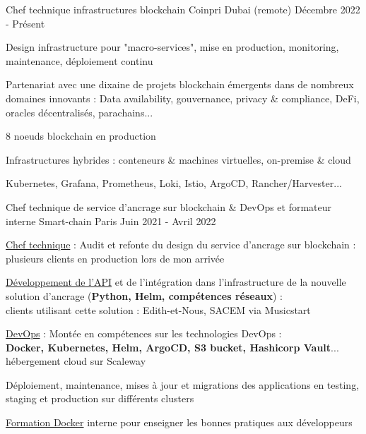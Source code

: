 
\begin{cventries}

  \cventry
    {Chef technique infrastructures blockchain} %
    {Coinpri} %
    {Dubai (remote)} %
    {Décembre 2022 - Présent} %
    {
      \begin{cvitems} %
        \item {Design infrastructure pour "macro-services", mise en production, monitoring, maintenance, déploiement continu}
        \item {Partenariat avec une dixaine de projets blockchain émergents dans de nombreux domaines innovants : Data availability, gouvernance, privacy \& compliance, DeFi, oracles décentralisés, parachains...}
        \item {8 noeuds blockchain en production}
        \item {Infrastructures hybrides : conteneurs \& machines virtuelles, on-premise \& cloud}
        \item {Kubernetes, Grafana, Prometheus, Loki, Istio, ArgoCD, Rancher/Harvester...}
      \end{cvitems}
    }

  \cventry
    {Chef technique de service d'ancrage sur blockchain \& DevOps et formateur interne} %
    {Smart-chain} %
    {Paris} %
    {Juin 2021 - Avril 2022} %
    {
      \begin{cvitems} %
      {
        \item {\underline{Chef technique} : Audit et refonte du design du service d'ancrage sur blockchain :\\plusieurs clients en production lors de mon arrivée}
        \item {\underline{Développement de l'API} et de l'intégration dans l'infrastructure de la nouvelle solution d'ancrage (\textbf{Python, Helm, compétences réseaux}) :\\clients utilisant cette solution : Edith-et-Nous, SACEM via Musicstart}
        \item {\underline{DevOps} : Montée en compétences sur les technologies DevOps :\\\textbf{Docker, Kubernetes, Helm, ArgoCD, S3 bucket, Hashicorp Vault}... hébergement cloud sur Scaleway}
        \item {Déploiement, maintenance, mises à jour et migrations des applications en testing, staging et production sur différents clusters}
        \item {\underline{Formation Docker} interne pour enseigner les bonnes pratiques aux développeurs}
      }
      \end{cvitems}
    }


\end{cventries}
